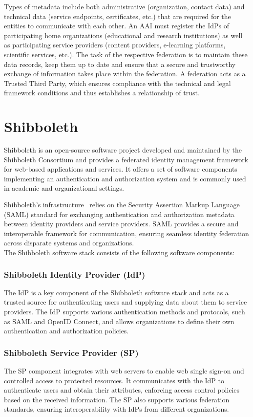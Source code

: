 Types of metadata include both administrative (organization, contact data) and
technical data (service endpoints, certificates, etc.) that are required for the
entities to communicate with each other. An AAI must register the IdPs of
participating home organizations (educational and research institutions) as well
as participating service providers (content providers, e-learning platforms,
scientific services, etc.). The task of the respective federation is to maintain
these data records, keep them up to date and ensure that a secure and
trustworthy exchange of information takes place within the federation. A
federation acts as a Trusted Third Party, which ensures compliance with the
technical and legal framework conditions and thus establishes a relationship of
trust. 

\section{Shibboleth}
Shibboleth is an open-source software project developed and maintained by the
Shibboleth Consortium and provides a federated identity management framework
for web-based applications and services. It offers a set of software components
implementing an authentication and authorization system and is commonly used in
academic and organizational settings.

Shibboleth's infrastructure~\cite{cantor2005shibboleth} relies on the Security
Assertion Markup Language (SAML) standard for exchanging authentication and
authorization metadata between identity providers and service providers. SAML
provides a secure and interoperable framework for communication, ensuring
seamless identity federation across disparate systems and organizations. \\

\noindent The Shibboleth software stack consists of the following software
components:

\subsubsection*{Shibboleth Identity Provider (IdP)}
The IdP is a key component of the Shibboleth software stack and acts as a
trusted source for authenticating users and supplying data about them to service
providers. The IdP supports various authentication methods and protocols, such
as SAML and OpenID Connect, and allows organizations to define their own
authentication and authorization policies.

\subsubsection*{Shibboleth Service Provider (SP)}
The SP component integrates with web servers to enable web single sign-on and
controlled access to protected resources. It communicates with the IdP to
authenticate users and obtain their attributes, enforcing access control
policies based on the received information. The SP also supports various
federation standards, ensuring interoperability with IdPs from different
organizations.

